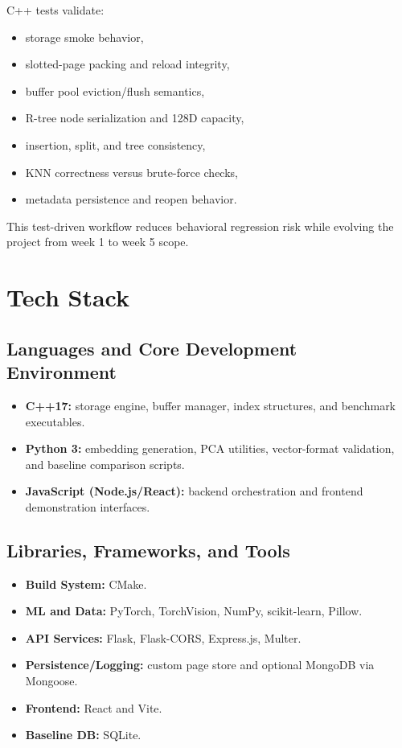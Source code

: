 \documentclass[11pt,a4paper]{article}
\begin{document}
C++ tests validate:

\begin{itemize}[leftmargin=1.5em]
  \item storage smoke behavior,
  \item slotted-page packing and reload integrity,
  \item buffer pool eviction/flush semantics,
  \item R-tree node serialization and 128D capacity,
  \item insertion, split, and tree consistency,
  \item KNN correctness versus brute-force checks,
  \item metadata persistence and reopen behavior.
\end{itemize}

This test-driven workflow reduces behavioral regression risk while evolving the project from week 1 to week 5 scope.

\section{Tech Stack}

\subsection{Languages and Core Development Environment}

\begin{itemize}[leftmargin=1.5em]
  \item \textbf{C++17:} storage engine, buffer manager, index structures, and benchmark executables.
  \item \textbf{Python 3:} embedding generation, PCA utilities, vector-format validation, and baseline comparison scripts.
  \item \textbf{JavaScript (Node.js/React):} backend orchestration and frontend demonstration interfaces.
\end{itemize}

\subsection{Libraries, Frameworks, and Tools}

\begin{itemize}[leftmargin=1.5em]
  \item \textbf{Build System:} CMake.
  \item \textbf{ML and Data:} PyTorch, TorchVision, NumPy, scikit-learn, Pillow.
  \item \textbf{API Services:} Flask, Flask-CORS, Express.js, Multer.
  \item \textbf{Persistence/Logging:} custom page store and optional MongoDB via Mongoose.
  \item \textbf{Frontend:} React and Vite.
  \item \textbf{Baseline DB:} SQLite.
\end{itemize}
\end{document}
